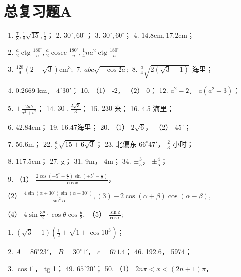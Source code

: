 \section{总复习题A}

\begin{enumerate}
\item
  \(\frac{7}{8}, \frac{1}{8} \sqrt{15}, \frac{1}{4}\)； 2.
  \(30^{\circ}, 60^{\circ}\)； 3. \(30^{\circ}, 60^{\circ}\)； 4.
  \(14.8\mathrm{cm}, 17.2\mathrm{cm}\)；
\item
  \(\frac{a}{2}\operatorname{ctg}\frac{180^{\circ}}{n},\frac{a}{2}\operatorname{cosec}\frac{180^{\circ}}{n},\frac{1}{4}na^{2}\operatorname{ctg}\frac{180^{\circ}}{n};\)
\item
  \(\frac{128}{9} (2 - \sqrt{3})\mathrm{cm}^3;\) 7.
  \(abc\sqrt{-\cos 2a};\) 8. \(\frac{a}{4}\sqrt{2(\sqrt{3} - 1)}\)
  海里；
\item
  0.2669 km， \(4^{\circ}30'\)； 10. （1） -2， （2） 0； 12.
  \(a^{2}-2\)， \(a(a^{2}-3)\)；
\item
  \(\pm \frac{2ab}{a^2 + b^2}\)； 14.
  \(30^\circ, \frac{2\sqrt{3}}{3}\)； 15. \(230\) 米； 16. 4.5 海里；
\item
  42.84cm； 19. 16.47海里； 20. （1） \(2\sqrt{6}\)， （2）
  \(45^{\circ}\)；
\item
  56.6m； 22. \(\frac{a}{3}\sqrt{15+6\sqrt{3}}\)； 23. 北偏东
  \(66^{\circ}47'\)， \(\frac{2}{3}\) 小时；
\item
  117.5cm； 27. g； 31. 9m， 4m； 34. ±\(\frac{3}{5}\)，
  ±\(\frac{4}{5}\)；
\item
  （1）
  \(\frac{2\cos\left(\pm5^{\circ}+\frac{x}{2}\right)\sin\left(\pm5^{\circ}-\frac{x}{2}\right)}{\cos x}\)，
\end{enumerate}

（2）
\(\frac{4\sin(\alpha + 30^\circ)\sin(\alpha - 30^\circ)}{\sin^2\alpha}, (3) -2\cos(\alpha + \beta)\cos(\alpha - \beta),\)

（4）
\(4\sin \frac{3\theta}{2}\cdot \cos \theta \cos \frac{\theta}{2},\)
（5） \(\frac{\sin\beta}{\cos\alpha};\)

\begin{enumerate}[start=39]
\item
  \((\sqrt{3} + 1)\left(\frac{1}{2} + \sqrt{1 + \cos 10^3}\right)\)；
\item
  \(A = 86^{\circ}23'\)， \(B = 30^{\circ}1'\)， \(c = 671.4\)； 46.
  192.6， 5974；
\item
  \(\cos 1^{\circ}\)， tg 1； 49. \(65^{\circ}20'\)； 50. （1）
  \(2n\pi < x < (2n + 1)\pi\)，
\end{enumerate}

